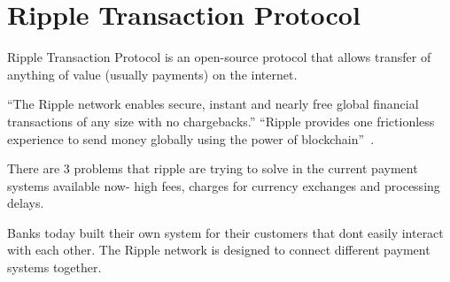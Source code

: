 \section{Ripple Transaction Protocol}

Ripple Transaction Protocol is an open-source protocol that allows
transfer of anything of value (usually payments) on the internet.

``The Ripple network enables secure, instant and nearly free global
financial transactions of any size with no chargebacks.''
\cite{hid-sp18-506-RippleNetwork} ``Ripple provides one frictionless
experience to send money globally using the power of
blockchain''~\cite{hid-sp18-506-GlobalPayment}.


There are 3 problems that ripple are trying to solve in the current
payment systems available now- high fees, charges for currency
exchanges and processing delays.

Banks today built their own system for their customers that dont
easily interact with each other. The Ripple network is designed to
connect different payment systems together.
